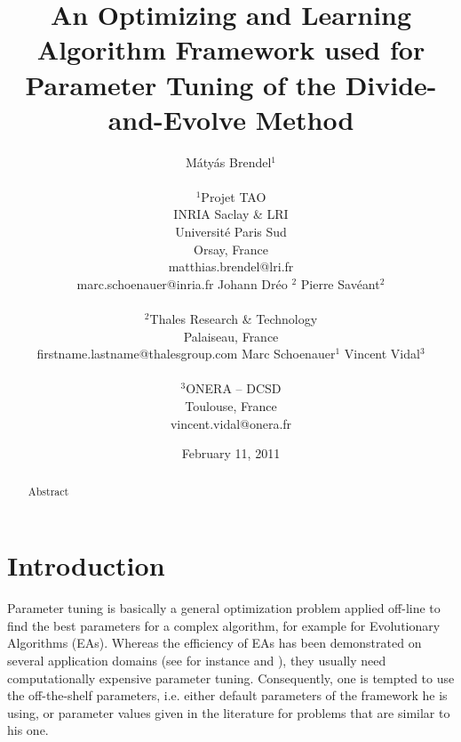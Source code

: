 \documentclass{article}
\begin{document}
\title{An Optimizing and Learning Algorithm Framework used for Parameter Tuning of the Divide-and-Evolve Method}


\author{M{\'a}ty{\'a}s Brendel$^{1}$ \\ \\ $^{1}$Projet TAO \\ INRIA Saclay \& LRI\\ Universit{\'e} Paris Sud \\ Orsay, France\\ matthias.brendel@lri.fr \\ marc.schoenauer@inria.fr
\And  Johann Dr{\'e}o $^{2}$ 
\And Pierre Sav{\'e}ant$^{2}$ \\ \\ $^{2}$Thales Research \& Technology\\ Palaiseau, France\\firstname.lastname@thalesgroup.com
\And Marc Schoenauer$^{1}$ 
\And Vincent Vidal$^{3}$ \\ \\ $^{3}$ONERA -- DCSD \\ Toulouse, France \\ vincent.vidal@onera.fr}





\date{February 11, 2011}
\maketitle
\begin{abstract}
\noindent Abstract
\end{abstract}
\section{Introduction}

Parameter tuning is basically a general optimization problem applied off-line to find the best parameters for a complex algorithm, for example for Evolutionary Algorithms (EAs). Whereas the efficiency of EAs has been demonstrated on several application domains (see for instance \cite{practice08} and \cite{ParameterSettingBook07}), they usually need computationally expensive parameter tuning. Consequently, one is tempted to use the off-the-shelf parameters, i.e. either default parameters of the framework he is using, or parameter values given in the literature for problems that are similar to his one. 
\end{document}
